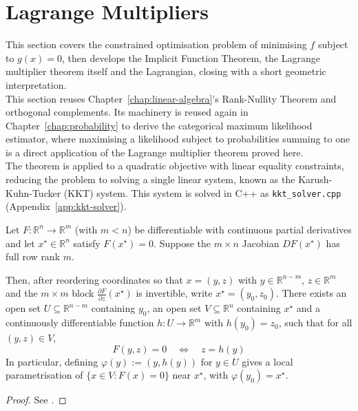 \section{Lagrange Multipliers}
	
	This section covers the constrained optimisation problem of minimising $f$ subject to $g(x)=0$, then develops the Implicit Function Theorem, the Lagrange multiplier theorem itself and the Lagrangian, closing with a short geometric interpretation. \\
	
	This section reuses Chapter~\ref{chap:linear-algebra}'s Rank-Nullity Theorem and orthogonal complements. Its machinery is reused again in Chapter~\ref{chap:probability} to derive the categorical maximum likelihood estimator, where maximising a likelihood subject to probabilities summing to one is a direct application of the Lagrange multiplier theorem proved here. \\
	
	The theorem is applied to a quadratic objective with linear equality constraints, reducing the problem to solving a single linear system, known as the Karush-Kuhn-Tucker (KKT) system. This system is solved in C++ as \texttt{kkt\_solver.cpp} (Appendix~\ref{app:kkt-solver}).
	
	\begin{theorem}
		\label{thm:implicit-function}
		Let $F:\mathbb{R}^n \to \mathbb{R}^m$ (with $m<n$) be differentiable with continuous partial derivatives and let $x^\star\in\mathbb{R}^n$ satisfy $F(x^\star)=0$. Suppose the $m\times n$ Jacobian $DF(x^\star)$ has full row rank $m$.
		
		Then, after reordering coordinates so that $x=(y,z)$ with $y\in\mathbb{R}^{n-m}$, $z\in\mathbb{R}^m$ and the $m\times m$ block $\frac{\partial F}{\partial z}(x^\star)$ is invertible, write $x^\star=(y_0,z_0)$. There exists an open set $U\subseteq\mathbb{R}^{n-m}$ containing $y_0$, an open set $V\subseteq\mathbb{R}^n$ containing $x^\star$ and a continuously differentiable function $h:U\to\mathbb{R}^m$ with $h(y_0)=z_0$, such that for all $(y,z)\in V$,
		\[
			F(y,z) = 0 \quad\Longleftrightarrow\quad z = h(y)
		\]
		In particular, defining $\varphi(y) := (y,h(y))$ for $y\in U$ gives a local parametrisation of $\{x\in V : F(x)=0\}$ near $x^\star$, with $\varphi(y_0) = x^\star$.
	\end{theorem}
	
	\begin{proof}
		See \cite[\S9.28]{Rudin1976}.
	\end{proof}
	
